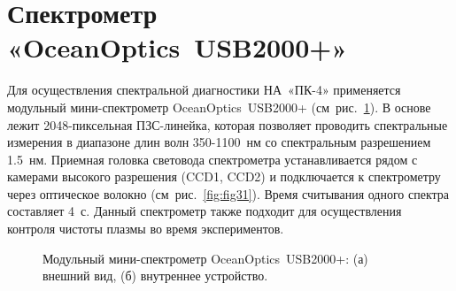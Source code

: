 \section{Спектрометр «OceanOptics~USB2000+»}
Для осуществления спектральной диагностики НА~«ПК-4» применяется модульный мини-спектрометр OceanOptics~USB2000+ (см~рис.~\ref{fig:full_usb2000+}).
В основе лежит 2048-пиксельная ПЗС-линейка, которая позволяет проводить спектральные измерения в диапазоне длин
волн 350-1100~нм со спектральным разрешением 1.5~нм. Приемная головка световода спектрометра устанавливается рядом
с камерами высокого разрешения (CCD1, CCD2) и подключается к спектрометру через оптическое волокно (см~рис.~\ref{fig:fig31}).
Время считывания одного спектра составляет 4~с. Данный спектрометр также подходит для осуществления
контроля чистоты плазмы во время экспериментов.
\begin{figure}[t]
    \begin{center}
         \caption{Модульный мини-спектрометр OceanOptics~USB2000+: \pt(а) внешний вид,
                  \pt(б) внутреннее устройство.}
    \label{fig:full_usb2000+}
    \end{center}
\end{figure}

